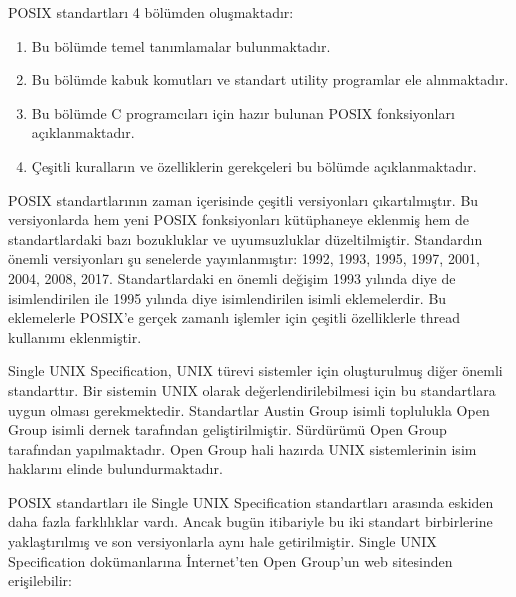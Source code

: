 \documentclass[a4paper,10pt,turkish]{sphinxmanual}
\begin{document}
\sphinxAtStartPar
POSIX standartları 4 bölümden oluşmaktadır:
\begin{enumerate}
%
\item {} 
\sphinxAtStartPar
{} Bu bölümde temel tanımlamalar bulunmaktadır.

\item {} 
\sphinxAtStartPar
{} Bu bölümde kabuk komutları ve standart utility programlar ele
alınmaktadır.

\item {} 
\sphinxAtStartPar
{} Bu bölümde C programcıları için hazır bulunan POSIX fonksiyonları
açıklanmaktadır.

\item {} 
\sphinxAtStartPar
{} Çeşitli kuralların ve özelliklerin gerekçeleri bu bölümde açıklanmaktadır.

\end{enumerate}

\sphinxAtStartPar
POSIX standartlarının zaman içerisinde çeşitli versiyonları çıkartılmıştır. Bu versiyonlarda
hem yeni POSIX fonksiyonları kütüphaneye eklenmiş hem de standartlardaki bazı bozukluklar
ve uyumsuzluklar düzeltilmiştir. Standardın önemli versiyonları şu senelerde yayınlanmıştır:
1992, 1993, 1995, 1997, 2001, 2004, 2008, 2017. Standartlardaki en önemli değişim 1993
yılında  diye de isimlendirilen  ile 1995 yılında 
diye isimlendirilen  isimli eklemelerdir. Bu eklemelerle POSIX’e gerçek
zamanlı işlemler için çeşitli özelliklerle thread kullanımı eklenmiştir.

\sphinxAtStartPar
Single UNIX Specification, UNIX türevi sistemler için oluşturulmuş diğer önemli standarttır.
Bir sistemin UNIX olarak değerlendirilebilmesi için bu standartlara uygun olması
gerekmektedir. Standartlar Austin Group isimli toplulukla Open Group isimli dernek tarafından
geliştirilmiştir. Sürdürümü Open Group tarafından yapılmaktadır. Open Group hali hazırda
UNIX sistemlerinin isim haklarını elinde bulundurmaktadır.

\sphinxAtStartPar
POSIX standartları ile Single UNIX Specification standartları arasında eskiden daha fazla
farklılıklar vardı. Ancak bugün itibariyle bu iki standart birbirlerine yaklaştırılmış ve
son versiyonlarla aynı hale getirilmiştir. Single UNIX Specification dokümanlarına
İnternet’ten Open Group’un web sitesinden erişilebilir:
\end{document}

